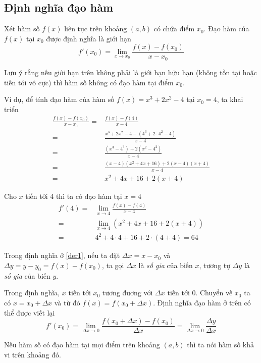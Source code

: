 \subsection*{Định nghĩa đạo hàm}

Xét hàm số $f(x)$ liên tục trên khoảng $(a, b)$ có chứa điểm $x_0$. Đạo hàm của $f(x)$ tại $x_0$ được định nghĩa là giới hạn
\begin{equation}
	f'(x_0) = \lim_{x \to x_0} \frac{f(x) - f(x_0)}{x - x_0}
	\label{der1}
\end{equation}

Lưu ý rằng nếu giới hạn trên không phải là giới hạn hữu hạn (không tồn tại hoặc tiến tới vô cực) thì hàm số không có đạo hàm tại điểm $x_0$.

Ví dụ, để tính đạo hàm của hàm số $f(x) = x^3 + 2 x^2 - 4$ tại $x_0 = 4$, ta khai triển
\begin{align*}
	\frac{f(x) - f(x_0)}{x - x_0} = & \frac{f(x) - f(4)}{x - 4} \\ = & \frac{x^3 + 2x^2 - 4 - (4^3 + 2 \cdot 4^2 - 4)}{x - 4} \\ = & \frac{(x^3 - 4^3) + 2(x^2 - 4^2)}{x - 4} \\ = & \frac{(x-4)(x^2 + 4x + 16) + 2 (x-4)(x+4)}{x - 4} \\ = & x^2 + 4 x + 16 + 2(x+4)
\end{align*}

Cho $x$ tiến tới 4 thì ta có đạo hàm tại $x = 4$
\begin{align*}
	f'(4) = & \lim_{x \to 4} \frac{f(x) - f(4)}{x - 4} \\ = & \lim_{x \to 4} (x^2 + 4x + 16 + 2(x+4)) \\ = & 4^2 + 4 \cdot 4 + 16 + 2 \cdot (4 + 4) = 64
\end{align*}

Trong định nghĩa ở \ref{der1}, nếu ta đặt $\Delta x = x - x_0$ và $\Delta y = y - y_0 = f(x) - f(x_0)$, ta gọi $\Delta x$ là \textit{số gia} của biến $x$, tương tự $\Delta y$ là \textit{số gia} của biến $y$.

Trong định nghĩa, $x$ tiến tới $x_0$ tương đương với $\Delta x$ tiến tới 0. Chuyển vế $x_0$ ta có $x = x_0 + \Delta x$ và từ đó $f(x) = f(x_0 + \Delta x)$. Định nghĩa đạo hàm ở trên có thể được viết lại
\begin{equation}
	f'(x_0) = \lim_{\Delta x \to 0} \frac{f(x_0 + \Delta x) - f(x_0)}{\Delta x} = \lim_{\Delta x \to 0} \frac{\Delta y}{\Delta x}
\end{equation}

Nếu hàm số có đạo hàm tại mọi điểm trên khoảng $(a, b)$ thì ta nói hàm số khả vi trên khoảng đó.

